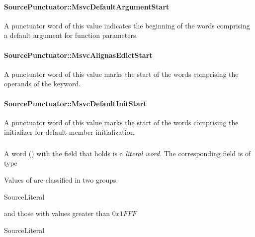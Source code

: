 \paragraph{SourcePunctuator::MsvcDefaultArgumentStart}
\label{sec:ifc:SourcePunctuator:MsvcDefaultArgumentStart}

A punctuator word of this value indicates the beginning of the words comprising
a default argument for function parameters.

\paragraph{SourcePunctuator::MsvcAlignasEdictStart}
\label{sec:ifc:SourcePunctuator:MsvcAlignasEdictStart}

A punctuator word of this value marks the start of the words comprising the operands
of the  keyword.


\paragraph{SourcePunctuator::MsvcDefaultInitStart}
\label{sec:ifc:SourcePunctuator:MsvcDefaultInitStart}

A punctuator word of this value marks the start of the words comprising the
initializer for default member initialization. 

\subsubsection{}
\label{sec:ifc:WordSort:Literal}

A word ()  with the  field that holds
 is a \emph{literal word}.  The corresponding 
 field is of type 

Values of  are classified in two groups.
\begin{Enumeration}{SourceLiteral}
\end{Enumeration}
and those with values greater than $0x1FFF$
\begin{Enumeration}{SourceLiteral}\setcounter{enumi}{8190}
\end{Enumeration}

